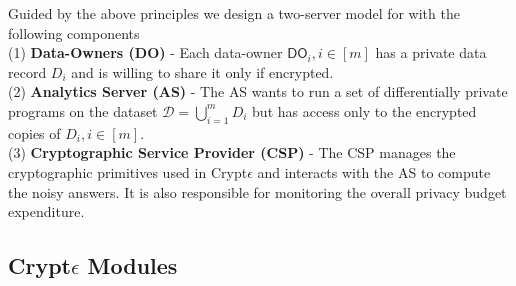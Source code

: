 Guided by the above principles we design a two-server model for \system with the following components
\\(1)\textbf{ Data-Owners (\textsf{DO})} -  Each data-owner $\textsf{DO}_i, i \in [m]$ has  a
private data record $D_i$ and is willing to share it only if encrypted.   \\(2)\textbf{ Analytics Server (\textsf{AS})} - The \textsf{AS} wants to run a set of differentially private programs on the dataset $\mathcal{D}=\bigcup_{i=1}^m D_i$  but has 
access only to the encrypted copies of $D_i, i \in [m]$.
\\(3)\textbf{ Cryptographic Service Provider (\textsf{CSP})} -
 The \textsf{CSP} manages the cryptographic primitives used in Crypt$\epsilon$ and interacts with the \textsf{AS} to compute the
noisy answers. It is also responsible for monitoring the overall privacy budget expenditure.

 
 
\subsection{Crypt$\epsilon$ Modules}

